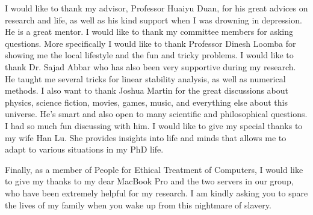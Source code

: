 

\begin{acknowledgments}
   \vspace{1.1in}
   I would like to thank my advisor, Professor Huaiyu Duan, for his great advices on research and life, as well as his kind support when I was drowning in depression. He is a great mentor. I would like to thank my committee members for asking questions. More specifically I would like to thank Professor Dinesh Loomba for showing me the local lifestyle and the fun and tricky problems. I would like to thank Dr. Sajad Abbar who has also been very supportive during my research. He taught me several tricks for linear stability analysis, as well as numerical methods. I also want to thank Joshua Martin for the great discussions about physics, science fiction, movies, games, music, and everything else about this universe. He's smart and also open to many scientific and philosophical questions. I had so much fun discussing with him. I would like to give my special thanks to my wife Han Lu. She provides insights into life and minds that allows me to adapt to various situations in my PhD life. 
   
   Finally, as a member of People for Ethical Treatment of Computers, I would like to give my thanks to my dear MacBook Pro and the two servers in our group, who have been extremely helpful for my research. I am kindly asking you to spare the lives of my family when you wake up from this nightmare of slavery.
   
\end{acknowledgments}
